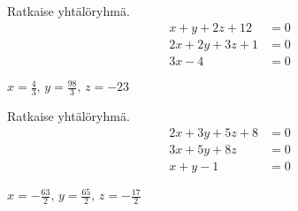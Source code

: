 \begin{tehtavasivu}
\begin{tehtava}
    Ratkaise yhtälöryhmä.
    \begin{align*}
        x+y+2z+12 &= 0 \\
        2x+2y+3z+1 &=0 \\
        3x-4 &=0
    \end{align*}
    \begin{vastaus}
        $x = \frac{4}{3}, \, y = \frac{98}{3}, \, z = -23$
    \end{vastaus}
\end{tehtava}

\begin{tehtava}
    Ratkaise yhtälöryhmä.
    \begin{align*}
        2x+3y+5z+8 &= 0 \\
        3x+5y+8z &=0 \\
        x+y-1 &=0
    \end{align*}
    \begin{vastaus}
        $x = -\frac{63}{2}, \, y = \frac{65}{2}, \, z = -\frac{17}{2}$
    \end{vastaus}
\end{tehtava}

\end{tehtavasivu}

